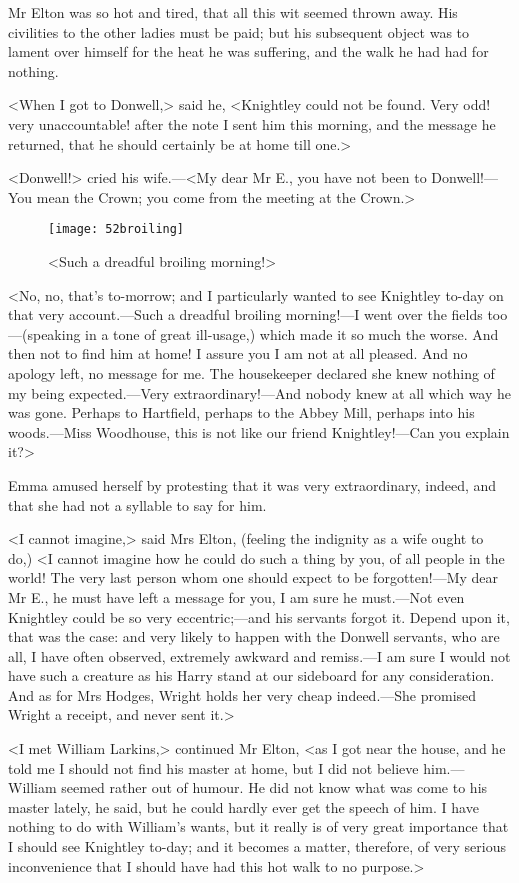Mr Elton was so hot and tired, that all this wit seemed thrown away. His civilities to the other ladies must be paid; but his subsequent object was to lament over himself for the heat he was suffering, and the walk he had had for nothing.

<When I got to Donwell,> said he, <Knightley could not be found. Very odd! very unaccountable! after the note I sent him this morning, and the message he returned, that he should certainly be at home till one.>

<Donwell!> cried his wife.—<My dear Mr E., you have not been to Donwell!—You mean the Crown; you come from the meeting at the Crown.>

\begin{figure}[tbph]
\centering
\texttt{[image: 52broiling]}
\caption{<Such a dreadful broiling morning!>}
\end{figure}

<No, no, that's to-morrow; and I particularly wanted to see Knightley to-day on that very account.—Such a dreadful broiling morning!—I went over the fields too—(speaking in a tone of great ill-usage,) which made it so much the worse. And then not to find him at home! I assure you I am not at all pleased. And no apology left, no message for me. The housekeeper declared she knew nothing of my being expected.—Very extraordinary!—And nobody knew at all which way he was gone. Perhaps to Hartfield, perhaps to the Abbey Mill, perhaps into his woods.—Miss Woodhouse, this is not like our friend Knightley!—Can you explain it?>

Emma amused herself by protesting that it was very extraordinary, indeed, and that she had not a syllable to say for him.

<I cannot imagine,> said Mrs Elton, (feeling the indignity as a wife ought to do,) <I cannot imagine how he could do such a thing by you, of all people in the world! The very last person whom one should expect to be forgotten!—My dear Mr E., he must have left a message for you, I am sure he must.—Not even Knightley could be so very eccentric;—and his servants forgot it. Depend upon it, that was the case: and very likely to happen with the Donwell servants, who are all, I have often observed, extremely awkward and remiss.—I am sure I would not have such a creature as his Harry stand at our sideboard for any consideration. And as for Mrs Hodges, Wright holds her very cheap indeed.—She promised Wright a receipt, and never sent it.>

<I met William Larkins,> continued Mr Elton, <as I got near the house, and he told me I should not find his master at home, but I did not believe him.—William seemed rather out of humour. He did not know what was come to his master lately, he said, but he could hardly ever get the speech of him. I have nothing to do with William's wants, but it really is of very great importance that I should see Knightley to-day; and it becomes a matter, therefore, of very serious inconvenience that I should have had this hot walk to no purpose.>

